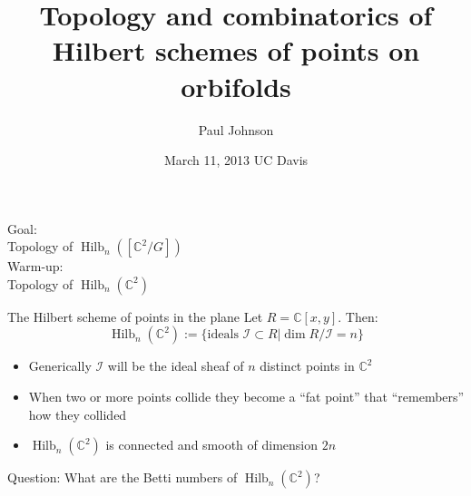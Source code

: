 \documentclass{beamer}
\DeclareMathOperator{\Hilb}{Hilb}
\newcommand{\C}{\mathbb{C}}
\begin{document}
\title{Topology and combinatorics of Hilbert schemes of points on orbifolds }
\author{Paul Johnson}
\date{March 11, 2013 \@ UC Davis}



\newcommand{\stepright}[2]{%
\begin{scope}[xshift=#1cm,yshift=#2cm]
\clip (-.5, -.5)-- ++(1,1) -- ++(1,0) -- ++ (-1,-1) -- ++(-1,0);
\draw[cap=rect] (0,0)--(1,0);
\end{scope}
}
\newcommand{\stepdown}[2]{%
\begin{scope}[xshift=#1cm,yshift=#2cm]
\clip (-.5, -.5)-- ++(1,1) -- ++(0,-1) -- ++ (-1,-1) -- ++(0,1);
\draw[cap=rect] (0,0)--(0,-1);
\end{scope}
}




\begin{frame}[plain]
  \titlepage
\end{frame}


\begin{frame}[plain,c]

\begin{center}

\Huge
\alert{Goal:} \\ Topology of $\Hilb_n([\C^2/G])$ \\
\vspace{1cm}
{
Warm-up: } \\Topology of $\Hilb_n(\C^2)$

\end{center}

\end{frame}




\begin{frame}{The Hilbert scheme of points in the plane}
Let $R=\C[x,y]$.  Then:
$$\Hilb_n(\C^2):=\{\textrm{ideals }\mathcal{I}\subset R | \dim R/\mathcal{I}=n\}$$ 
\begin{itemize}
\item Generically $\mathcal{I}$ will be the ideal sheaf of $n$ distinct points in $\C^2$
\item When two or more points collide they become a ``fat point'' that ``remembers'' how they collided
\item $\Hilb_n(\C^2)$ is connected and smooth of dimension $2n$
\end{itemize}

\begin{block}{Question: What are the Betti numbers of $\Hilb_n(\C^2)$?}
  
\end{block}

\end{frame}
\end{document}
